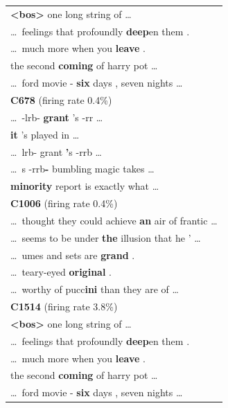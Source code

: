 \begin{longtable}{@{}>{\ttfamily}p{\linewidth}@{}}
    \toprule
    \endhead
    {\normalfont\textbf{C68} \hfill (firing rate 3.8\%)}\\
    \cmidrule(){1-1}
    \textbf{\textless bos\textgreater} one long string of \dots\\
    \dots\ feelings that profoundly\textbf{ deep}en them .\\
    \dots\ much more when you\textbf{ leave} .\\
    the second\textbf{ coming} of harry pot \dots\\
    \dots\ ford movie -\textbf{ six} days , seven nights \dots\\
    \addlinespace
    {\normalfont\textbf{C678} \hfill (firing rate 0.4\%)}\\
    \cmidrule(){1-1}
    \dots\ -lrb-\textbf{ grant} 's -rr \dots\\
    \textbf{it} 's played in \dots\\
    \dots\ lrb- grant\textbf{ '}s -rrb \dots\\
    \dots\ s -rrb\textbf{-} bumbling magic takes \dots\\
    \textbf{minority} report is exactly what \dots\\
    \addlinespace
    {\normalfont\textbf{C1006} \hfill (firing rate 0.4\%)}\\
    \cmidrule(){1-1}
    \dots\ thought they could achieve\textbf{ an} air of frantic \dots\\
    \dots\ seems to be under\textbf{ the} illusion that he ' \dots\\
    \dots\ umes and sets are\textbf{ grand} .\\
    \dots\ teary-eyed\textbf{ original} .\\
    \dots\ worthy of pucc\textbf{ini} than they are of \dots\\
    \addlinespace
    \newpage
    {\normalfont\textbf{C1514} \hfill (firing rate 3.8\%)}\\
    \cmidrule(){1-1}
    \textbf{\textless bos\textgreater} one long string of \dots\\
    \dots\ feelings that profoundly\textbf{ deep}en them .\\
    \dots\ much more when you\textbf{ leave} .\\
    the second\textbf{ coming} of harry pot \dots\\
    \dots\ ford movie -\textbf{ six} days , seven nights \dots\\

\end{longtable}
